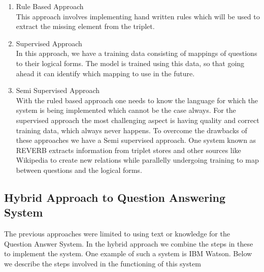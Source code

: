 \begin{enumerate}

\item Rule Based Approach \\
This approach involves implementing hand written rules which will be used to extract the missing element from the triplet.
 
 \item Supervised Approach \\
In this approach, we have a training data consisting of mappings of questions to their logical forms. The model is trained using this data, so that going ahead it can identify which mapping to use in the future.
 
 \item Semi Supervised Approach \\
With the ruled based approach one needs to know the language for which the system is being implemented which cannot be the case always. For the supervised approach the most challenging aspect is having quality and correct training data, which always never happens. To overcome the drawbacks of these approaches we have a Semi supervised approach. One system known as REVERB extracts information from triplet stores and other sources like Wikipedia to create new relations while parallelly undergoing training to map between questions and the logical forms.

\end{enumerate}

\subsection{Hybrid Approach to Question Answering System}
The previous approaches were limited to using text or knowledge for the Question Answer System. In the hybrid approach we combine the steps in these to implement the system. One example of such a system is IBM Watson. Below we describe the steps involved in the functioning of this system

